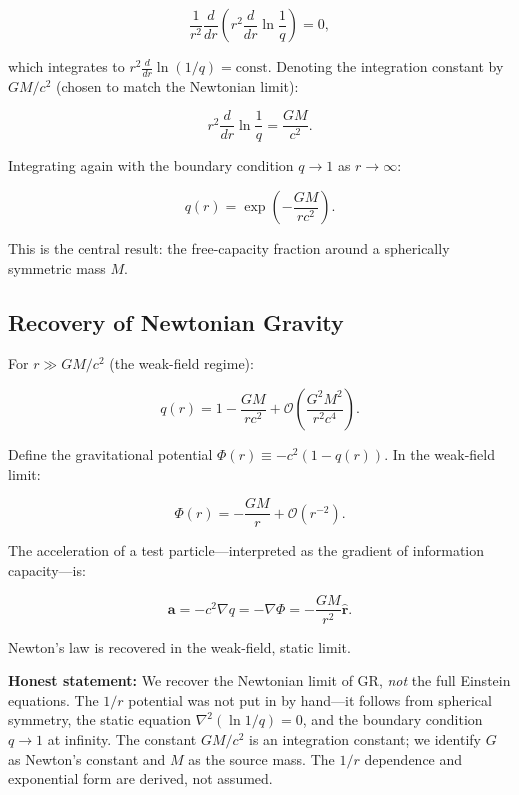 \documentclass[aps,prd,twocolumn,showpacs,superscriptaddress,preprintnumbers]{revtex4-2}
\begin{document}
\begin{equation}
\frac{1}{r^2}\frac{d}{dr}\left(r^2 \frac{d}{dr}\ln\frac{1}{q}\right) = 0,
\label{eq:ode}
\end{equation}

which integrates to $r^2\frac{d}{dr}\ln(1/q)=\text{const}$.
Denoting the integration constant by $GM/c^2$ (chosen to match the Newtonian limit):

\begin{equation}
r^2 \frac{d}{dr}\ln\frac{1}{q} = \frac{GM}{c^2}.
\label{eq:first_int}
\end{equation}

Integrating again with the boundary condition $q\to1$ as $r\to\infty$:

\begin{equation}
\boxed{q(r) = \exp\left(-\frac{GM}{rc^2}\right)}.
\label{eq:q_solution}
\end{equation}

This is the central result: the free-capacity fraction around a spherically symmetric mass $M$.

\subsection{Recovery of Newtonian Gravity}

For $r\gg GM/c^2$ (the weak-field regime):

\begin{equation}
q(r) = 1 - \frac{GM}{rc^2} + \mathcal{O}\left(\frac{G^2 M^2}{r^2 c^4}\right).
\label{eq:q_expand}
\end{equation}

Define the gravitational potential $\Phi(r)\equiv-c^2(1-q(r))$.
In the weak-field limit:

\begin{equation}
\boxed{\Phi(r) = -\frac{GM}{r} + \mathcal{O}(r^{-2})}.
\label{eq:newton}
\end{equation}

The acceleration of a test particle---interpreted as the gradient of information capacity---is:

\begin{equation}
\mathbf{a} = -c^2 \nabla q = -\nabla\Phi = -\frac{GM}{r^2}\hat{\mathbf{r}}.
\label{eq:accel}
\end{equation}

Newton's law is recovered in the weak-field, static limit.

\textbf{Honest statement:} We recover the Newtonian limit of GR, \emph{not} the full Einstein equations.
The $1/r$ potential was not put in by hand---it follows from spherical symmetry, the static equation $\nabla^2(\ln 1/q)=0$, and the boundary condition $q\to1$ at infinity.
The constant $GM/c^2$ is an integration constant; we identify $G$ as Newton's constant and $M$ as the source mass.
The $1/r$ dependence and exponential form are derived, not assumed.
\end{document}
